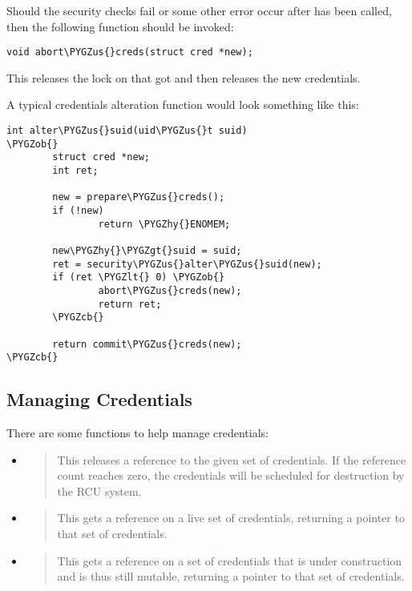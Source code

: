 \documentclass[a4paper,8pt,english]{sphinxmanual}
\def\PYGZus{\char`\_}
\def\PYGZob{\char`\{}
\def\PYGZcb{\char`\}}
\def\PYGZlt{\char`\<}
\def\PYGZgt{\char`\>}
\def\PYGZhy{\char`\-}
\begin{document}
Should the security checks fail or some other error occur after
 has been called, then the following function should be
invoked:

\begin{Verbatim}[commandchars=\\\{\}]
void abort\PYGZus{}creds(struct cred *new);
\end{Verbatim}

This releases the lock on  that
 got and then releases the new credentials.

A typical credentials alteration function would look something like this:

\begin{Verbatim}[commandchars=\\\{\}]
int alter\PYGZus{}suid(uid\PYGZus{}t suid)
\PYGZob{}
        struct cred *new;
        int ret;

        new = prepare\PYGZus{}creds();
        if (!new)
                return \PYGZhy{}ENOMEM;

        new\PYGZhy{}\PYGZgt{}suid = suid;
        ret = security\PYGZus{}alter\PYGZus{}suid(new);
        if (ret \PYGZlt{} 0) \PYGZob{}
                abort\PYGZus{}creds(new);
                return ret;
        \PYGZcb{}

        return commit\PYGZus{}creds(new);
\PYGZcb{}
\end{Verbatim}


\subsection{Managing Credentials}
\label{security/credentials:managing-credentials}
There are some functions to help manage credentials:
\begin{itemize}
\item {} 
\begin{quote}

This releases a reference to the given set of credentials.  If the
reference count reaches zero, the credentials will be scheduled for
destruction by the RCU system.
\end{quote}

\item {} 
\begin{quote}

This gets a reference on a live set of credentials, returning a pointer to
that set of credentials.
\end{quote}

\item {} 
\begin{quote}

This gets a reference on a set of credentials that is under construction
and is thus still mutable, returning a pointer to that set of credentials.
\end{quote}

\end{itemize}
\end{document}
